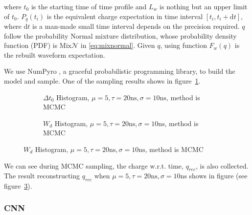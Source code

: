 where $t_{0}$ is the starting time of time profile and $L_{w}$ is nothing but an upper limit of $t_{0}$. $P_{q}(t_{i})$ is the equivalent charge expectation in time interval $[t_{i}, t_{i}+\mathrm{d}t]$, where $\mathrm{d}t$ is a man-made small time interval depends on the precision required. $q$ follow the probability Normal mixture distribution, whose probability density function (PDF) is $\mathrm{Mix}\mathcal{N}$ in \eqref{eq:mixnormal}. Given $q$, using function $F_{w}(q)$ is the rebuilt waveform expectation. 

We use NumPyro \cite{phan2019composable}, a graceful probabilistic programming library, to build the model and sample. One of the sampling results shows in figure~\ref{fig:mcmcrec-t0hist}. 

\begin{figure}[H]
\begin{minipage}[t]{.5\textwidth}
\begin{figure}[H]
    \centering
    \resizebox{\textwidth}{!}{}
    \caption{\label{fig:mcmcrec-t0hist} $\Delta t_{0}$ Histogram, $\mu=5, \tau=20\mathrm{ns}, \sigma=10\mathrm{ns}$, method is MCMC}
\end{figure}
\end{minipage}
\begin{minipage}[t]{.5\textwidth}
\begin{figure}[H]
    \centering
    \resizebox{\textwidth}{!}{}
    \caption{\label{fig:mcmcrec-chargehist} $W_{d}$ Histogram, $\mu=5, \tau=20\mathrm{ns}, \sigma=10\mathrm{ns}$, method is MCMC}
\end{figure}
\end{minipage}
\end{figure}

We can see during MCMC sampling, the charge w.r.t. time, $q_{rec}$, is also collected. The result reconstructing $q_{rec}$ when $\mu=5, \tau=20\mathrm{ns}, \sigma=10\mathrm{ns}$ shows in figure (see figure~\ref{fig:mcmcrec-chargehist}). 

\subsubsection{CNN}

